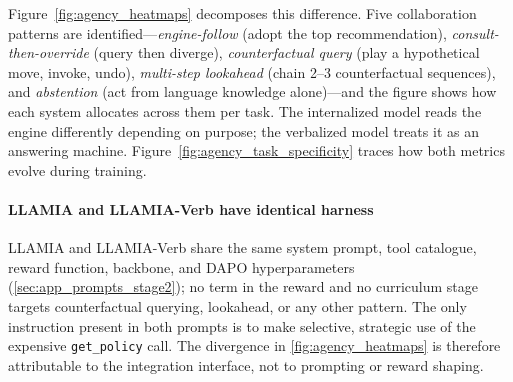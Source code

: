 Figure~\ref{fig:agency_heatmaps} decomposes this difference. Five collaboration patterns are identified---\emph{engine-follow} (adopt the top recommendation), \emph{consult-then-override} (query then diverge), \emph{counterfactual query} (play a hypothetical move, invoke, undo), \emph{multi-step lookahead} (chain 2--3 counterfactual sequences), and \emph{abstention} (act from language knowledge alone)---and the figure shows how each system allocates across them per task. The internalized model reads the engine differently depending on purpose; the verbalized model treats it as an answering machine. Figure~\ref{fig:agency_task_specificity} traces how both metrics evolve during training.

\paragraph{LLAMIA and LLAMIA-Verb have identical harness} LLAMIA and LLAMIA-Verb share the same system prompt, tool catalogue, reward function, backbone, and DAPO hyperparameters (\cref{sec:app_prompts_stage2}); no term in the reward and no curriculum stage targets counterfactual querying, lookahead, or any other pattern. The only instruction present in both prompts is to make selective, strategic use of the expensive \texttt{get\_policy} call. The divergence in \cref{fig:agency_heatmaps} is therefore attributable to the integration interface, not to prompting or reward shaping.

